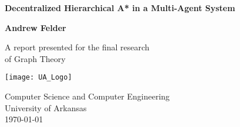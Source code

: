 \begin{titlepage}
	\begin{center}
		\vspace*{1cm}
        
        \Large
        \textbf{Decentralized Hierarchical A* in a Multi-Agent System}
        
        
        \vspace{1.5cm}
        \Large
        \textbf{Andrew Felder}
        
        \vfill
        
        A report presented for the final research\\
        of Graph Theory
        
        \vspace{0.8cm}
        
        \texttt{[image: UA\_Logo]}
        
        
        \Large
        Computer Science and Computer Engineering\\
        University of Arkansas\\
        \today
	\end{center}
\end{titlepage}